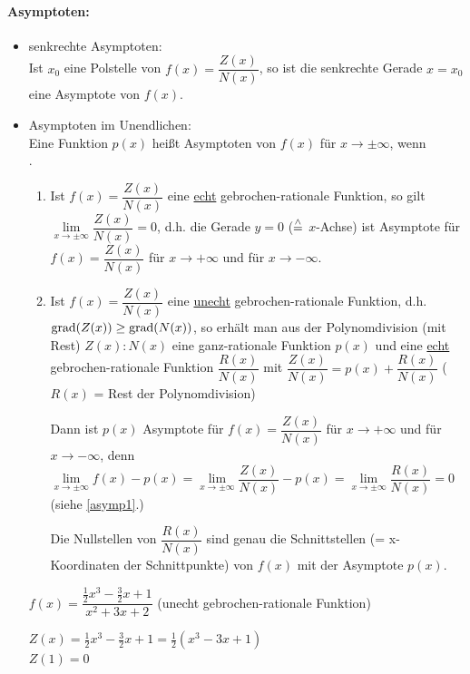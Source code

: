 \paragraph{Asymptoten:}
\begin{itemize}
	\item senkrechte Asymptoten:\\
	Ist $x_0$ eine Polstelle von $f(x) = \dfrac{Z(x)}{N(x)}$, so ist die senkrechte Gerade $x=x_0$ eine Asymptote von $f(x)$.
	\item Asymptoten im Unendlichen:\\
	Eine Funktion $p(x)$ heißt Asymptoten von $f(x)$ für $x\to\pm\infty$, wenn\\
	.
	
	\Satz{\hfill}
	
	\begin{enumerate}
		\item\label{asymp1} Ist $f(x)=\dfrac{Z(x)}{N(x)}$ eine \ul{echt} gebrochen-rationale Funktion, so gilt $\lim\limits_{x\to\pm\infty}\dfrac{Z(x)}{N(x)}=0$, d.h. die Gerade $y=0$ ($\stackrel{\wedge}{=}$ $x$-Achse) ist Asymptote für $f(x)=\dfrac{Z(x)}{N(x)}$ für $x\to+\infty$ und für $x\to-\infty$.
		
		\item Ist $f(x)=\dfrac{Z(x)}{N(x)}$ eine \ul{unecht} gebrochen-rationale Funktion, d.h. $\mathbin\text{grad}(Z(x))\ge\mathbin\text{grad}(N(x))$, so erhält man aus der Polynomdivision (mit Rest) $Z(x):N(x)$ eine ganz-rationale Funktion $p(x)$ und eine \ul{echt} gebrochen-rationale Funktion $\dfrac{R(x)}{N(x)}$ mit $\dfrac{Z(x)}{N(x)}=p(x)+\dfrac{R(x)}{N(x)}$ \qquad($R(x)$ = Rest der Polynomdivision)
		
		Dann ist $p(x)$ Asymptote für $f(x)=\dfrac{Z(x)}{N(x)}$ für $x\to+\infty$ und für $x\to-\infty$, denn\\
		$\lim\limits_{x\to\pm\infty}f(x)-p(x)=\lim\limits_{x\to\pm\infty}\dfrac{Z(x)}{N(x)}-p(x)=\lim\limits_{x\to\pm\infty}\dfrac{R(x)}{N(x)}=0$ (siehe \ref*{asymp1}.)
		
		Die Nullstellen von $\dfrac{R(x)}{N(x)}$ sind genau die Schnittstellen (= x-Koordinaten der Schnittpunkte) von $f(x)$ mit der Asymptote $p(x)$.
	\end{enumerate}
	
	\Bsp $f(x)=\dfrac{\frac{1}{2}x^3-\frac{3}{2}x+1}{x^2+3x+2}$ (unecht gebrochen-rationale Funktion)
	
	$Z(x)=\frac{1}{2}x^3-\frac{3}{2}x+1 = \frac{1}{2}(x^3-3x+1)$\\
	$Z(1) = 0$
	

\end{itemize}
